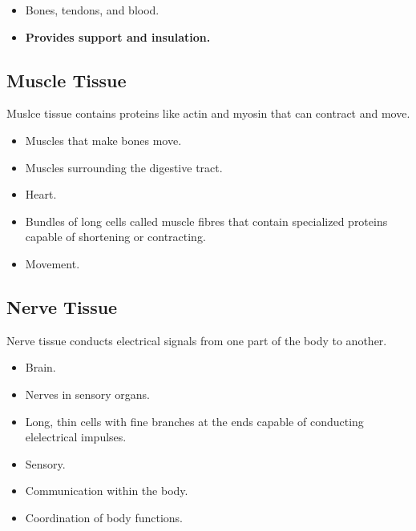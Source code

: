 \documentclass[12pt]{report}
\begin{document}
\begin{itemize}
    \item{Bones, tendons, and blood.}
    \item{\textbf{Provides support and insulation.}}
\end{itemize}

\subsection{Muscle Tissue}
\begin{definition}
    Muslce tissue contains proteins like actin and myosin that can contract and move.
\end{definition}

\begin{itemize}
    \item{Muscles that make bones move.}
    \item{Muscles surrounding the digestive tract.}
    \item{Heart.}
        \divider
    \item{Bundles of long cells called muscle fibres that contain specialized proteins capable of shortening or contracting.}
        \divider
    \item{Movement.}
\end{itemize}

\subsection{Nerve Tissue}
\begin{definition}
    Nerve tissue conducts electrical signals from one part of the body to another.
\end{definition}

\begin{itemize}
    \item{Brain.}
    \item{Nerves in sensory organs.}
        \divider
    \item{Long, thin cells with fine branches at the ends capable of conducting elelectrical impulses.}
        \divider
    \item{Sensory.}
    \item{Communication within the body.}
    \item{Coordination of body functions.}
\end{itemize}

\end{document}
